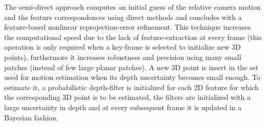 

The semi-direct approach computes an initial guess of the relative camera motion and the feature correspondences using direct methods and concludes with a feature-based nonlinear reprojection-error refinement. This technique increases the computational speed due to the lack of feature-extraction at every frame (this operation is only required when a key-frame is selected to initialize new 3D points), furthermore it increases robustness and precision using many small patches (instead of few large planar patches).
A new 3D point is insert in the set used for motion estimation when its depth uncertainty becomes small enough. To estimate it, a probabilistic depth-filter is initialized for each 2D feature for which the corresponding 3D point is to be estimated, the filters are initialized with a large uncertainty in depth and at every subsequent frame it is updated in a Bayesian fashion.



